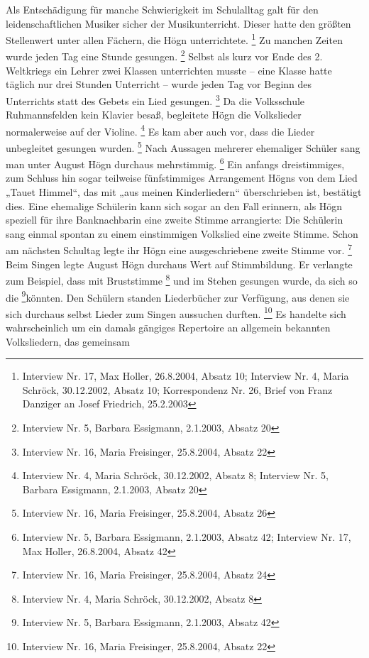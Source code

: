Als Entschädigung für manche Schwierigkeit im Schulalltag galt für den
leidenschaftlichen Musiker sicher der Musikunterricht. Dieser hatte den
größten Stellenwert unter allen Fächern, die Högn
unterrichtete. \footnote{Interview Nr. 17, Max Holler, 26.8.2004,
Absatz 10; Interview Nr. 4, Maria Schröck, 30.12.2002, Absatz 10;
Korrespondenz Nr. 26, Brief von Franz Danziger an Josef Friedrich,
25.2.2003} Zu manchen Zeiten wurde jeden Tag eine Stunde
gesungen. \footnote{Interview Nr. 5, Barbara Essigmann, 2.1.2003,
Absatz 20} Selbst als kurz vor Ende des 2. Weltkriegs ein Lehrer zwei
Klassen unterrichten musste – eine Klasse hatte täglich nur drei
Stunden Unterricht – wurde jeden Tag vor Beginn des Unterrichts statt
des Gebets ein Lied gesungen. \footnote{Interview Nr. 16, Maria
Freisinger, 25.8.2004, Absatz 22} Da die Volksschule Ruhmannsfelden
kein Klavier besaß, begleitete Högn die Volkslieder normalerweise auf
der Violine. \footnote{Interview Nr. 4, Maria Schröck, 30.12.2002,
Absatz 8; Interview Nr. 5, Barbara Essigmann, 2.1.2003, Absatz 20} Es
kam aber auch vor, dass die Lieder unbegleitet gesungen
wurden. \footnote{Interview Nr. 16, Maria Freisinger, 25.8.2004, Absatz
26} Nach Aussagen mehrerer ehemaliger Schüler sang man unter August
Högn durchaus mehrstimmig. \footnote{Interview Nr. 5, Barbara
Essigmann, 2.1.2003, Absatz 42; Interview Nr. 17, Max Holler,
26.8.2004, Absatz 42} Ein anfangs dreistimmiges, zum Schluss hin sogar
teilweise fünfstimmiges Arrangement Högns von dem Lied „Tauet Himmel“,
das mit „aus meinen Kinderliedern“ überschrieben ist, bestätigt dies.
Eine ehemalige Schülerin kann sich sogar an den Fall erinnern, als Högn
speziell für ihre Banknachbarin eine zweite Stimme arrangierte: Die
Schülerin sang einmal spontan zu einem einstimmigen Volkslied eine
zweite Stimme. Schon am nächsten Schultag legte ihr Högn eine
ausgeschriebene zweite Stimme vor. \footnote{Interview Nr. 16, Maria
Freisinger, 25.8.2004, Absatz 24} Beim Singen legte August Högn
durchaus Wert auf Stimmbildung. Er verlangte zum Beispiel, dass mit
Bruststimme \footnote{Interview Nr. 4, Maria Schröck, 30.12.2002,
Absatz 8} und im Stehen gesungen wurde, da sich so die
 \footnote{Interview Nr. 5, Barbara Essigmann, 2.1.2003, Absatz
42}\zitat{ }könnten. Den Schülern standen Liederbücher zur
Verfügung, aus denen sie sich durchaus selbst Lieder zum Singen
aussuchen durften. \footnote{Interview Nr. 16, Maria Freisinger,
25.8.2004, Absatz 22} Es handelte sich wahrscheinlich um ein damals
gängiges Repertoire an allgemein bekannten Volksliedern, das gemeinsam
